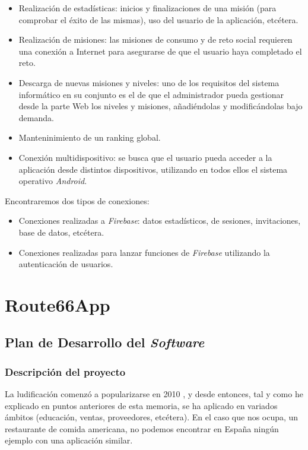 \documentclass[twoside]{report}
\begin{document}
\begin{itemize}
\item Realización de estadísticas: inicios y finalizaciones de una misión (para comprobar el éxito de las mismas), uso del usuario de la aplicación, etcétera.

\item Realización de misiones: las misiones de consumo y de reto social requieren una conexión a Internet para asegurarse de que el usuario haya completado el reto.

\item Descarga de nuevas misiones y niveles: uno de los requisitos del sistema informático en su conjunto es el de que el administrador pueda gestionar desde la parte Web los niveles y misiones, añadiéndolas y modificándolas bajo demanda.

\item Manteninimiento de un ranking global.

\item Conexión multidispositivo: se busca que el usuario pueda acceder a la aplicación desde distintos dispositivos, utilizando en todos ellos el sistema operativo \textit{Android}.
\end{itemize}

Encontraremos dos tipos de conexiones:

\begin{itemize}
\item Conexiones realizadas a \textit{Firebase}: datos estadísticos, de sesiones, invitaciones, base de datos, etcétera.

\item Conexiones realizadas para lanzar funciones de \textit{Firebase} utilizando la autenticación de usuarios.

\end{itemize}


\chapter{Route66App}
\section{Plan de Desarrollo del \textit{Software}}
\subsection{Descripción del proyecto}

La ludificación comenzó a popularizarse en 2010 \cite{anatfg}, y desde entonces, tal y como he explicado en puntos anteriores de esta memoria, se ha aplicado en variados ámbitos (educación, ventas, proveedores, etcétera). En el caso que nos ocupa, un restaurante de comida americana, no podemos encontrar en España ningún ejemplo  con una aplicación similar.
\end{document}
